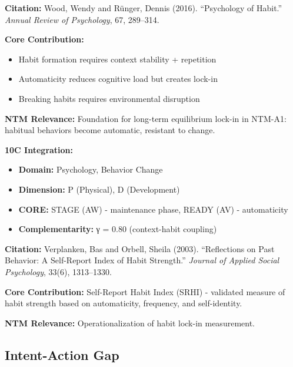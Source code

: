 \begin{tcolorbox}[colback=yellow!5!white,colframe=yellow!75!black,title=Key Paper: Wood \& Rünger (2016)]
\textbf{Citation:} Wood, Wendy and Rünger, Dennis (2016). ``Psychology of Habit.'' \textit{Annual Review of Psychology}, 67, 289--314.

\textbf{Core Contribution:}
\begin{itemize}[nosep]
    \item Habit formation requires context stability + repetition
    \item Automaticity reduces cognitive load but creates lock-in
    \item Breaking habits requires environmental disruption
\end{itemize}

\textbf{NTM Relevance:} Foundation for long-term equilibrium lock-in in NTM-A1: habitual behaviors become automatic, resistant to change.

\textbf{10C Integration:}
\begin{itemize}[nosep]
    \item \textbf{Domain:} Psychology, Behavior Change
    \item \textbf{Dimension:} P (Physical), D (Development)
    \item \textbf{CORE:} STAGE (AW) - maintenance phase, READY (AV) - automaticity
    \item \textbf{Complementarity:} γ = 0.80 (context-habit coupling)
\end{itemize}
\end{tcolorbox}

\begin{tcolorbox}[colback=gray!5!white,colframe=gray!75!black,title=Supporting Paper: Verplanken \& Orbell (2003)]
\textbf{Citation:} Verplanken, Bas and Orbell, Sheila (2003). ``Reflections on Past Behavior: A Self-Report Index of Habit Strength.'' \textit{Journal of Applied Social Psychology}, 33(6), 1313--1330.

\textbf{Core Contribution:} Self-Report Habit Index (SRHI) - validated measure of habit strength based on automaticity, frequency, and self-identity.

\textbf{NTM Relevance:} Operationalization of habit lock-in measurement.
\end{tcolorbox}

\subsection{Intent-Action Gap}
\label{subsec:ot-intent-action}

